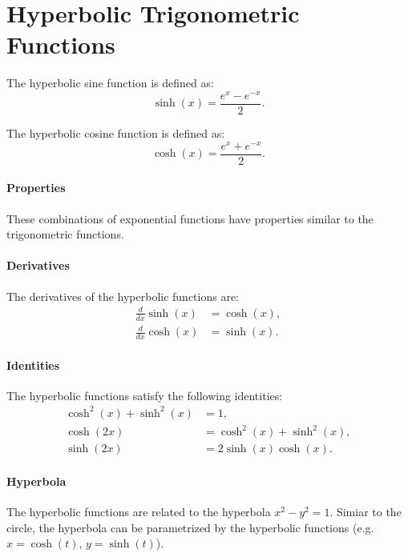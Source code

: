 \documentclass[11pt]{article}
\begin{document}
\section{Hyperbolic Trigonometric Functions}
\begin{definition}
    The hyperbolic sine function is defined as:
    \begin{equation} \sinh(x) = \frac{e^x - e^{-x}}{2}. \end{equation}
\end{definition}
\begin{definition}
    The hyperbolic cosine function is defined as:
    \begin{equation}  \cosh(x) = \frac{e^x + e^{-x}}{2}. \end{equation}
\end{definition}
\paragraph{Properties} These combinations of exponential functions have properties similar to the trigonometric functions.
\paragraph{Derivatives} The derivatives of the hyperbolic functions are:
\begin{align}
    \frac{d}{dx} \sinh(x) &= \cosh(x), \\
    \frac{d}{dx} \cosh(x) &= \sinh(x).
\end{align}
\paragraph{Identities} The hyperbolic functions satisfy the following identities:
\begin{align}
    \cosh^2(x) + \sinh^2(x) &= 1, \\
    \cosh(2x) &= \cosh^2(x) + \sinh^2(x), \\
    \sinh(2x) &= 2\sinh(x)\cosh(x).
\end{align}
\paragraph{Hyperbola} The hyperbolic functions are related to the hyperbola $x^2 - y^2 = 1$. Simiar to the circle, the hyperbola can be parametrized by the hyperbolic functions (e.g. $x = \cosh(t)$, $y = \sinh(t)$).
\end{document}
